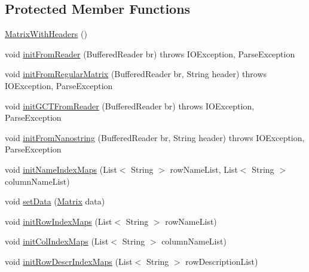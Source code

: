 \subsection*{Protected Member Functions}
\begin{DoxyCompactItemize}
\item 
\hyperlink{classbroad_1_1core_1_1datastructures_1_1_matrix_with_headers_a42a72c4a4dfca058d787728bbeabd106}{Matrix\+With\+Headers} ()
\item 
void \hyperlink{classbroad_1_1core_1_1datastructures_1_1_matrix_with_headers_ad1dda51b2e8707e56035714a58497111}{init\+From\+Reader} (Buffered\+Reader br)  throws I\+O\+Exception, 			\+Parse\+Exception 
\item 
void \hyperlink{classbroad_1_1core_1_1datastructures_1_1_matrix_with_headers_a96c809f62854178409a3f7dcd9623f7c}{init\+From\+Regular\+Matrix} (Buffered\+Reader br, String header)  throws I\+O\+Exception, Parse\+Exception 
\item 
void \hyperlink{classbroad_1_1core_1_1datastructures_1_1_matrix_with_headers_a8b562e19039440efdb63cf07a4bd4d83}{init\+G\+C\+T\+From\+Reader} (Buffered\+Reader br)  throws I\+O\+Exception, Parse\+Exception 
\item 
void \hyperlink{classbroad_1_1core_1_1datastructures_1_1_matrix_with_headers_a17270eccd2e5fe75b45d02e921331c13}{init\+From\+Nanostring} (Buffered\+Reader br, String header)  throws I\+O\+Exception, Parse\+Exception 
\item 
void \hyperlink{classbroad_1_1core_1_1datastructures_1_1_matrix_with_headers_a6a2f525112e1854bfa5c88efabb92b4c}{init\+Name\+Index\+Maps} (List$<$ String $>$ row\+Name\+List, List$<$ String $>$ column\+Name\+List)
\item 
void \hyperlink{classbroad_1_1core_1_1datastructures_1_1_matrix_with_headers_aba318448932df190ad98f6f13727fe65}{set\+Data} (\hyperlink{class_jama_1_1_matrix}{Matrix} data)
\item 
void \hyperlink{classbroad_1_1core_1_1datastructures_1_1_matrix_with_headers_a2d2aa137110ec59c81a845a9c0aea5a6}{init\+Row\+Index\+Maps} (List$<$ String $>$ row\+Name\+List)
\item 
void \hyperlink{classbroad_1_1core_1_1datastructures_1_1_matrix_with_headers_a49a5493e04b7998de5a00eca271510e6}{init\+Col\+Index\+Maps} (List$<$ String $>$ column\+Name\+List)
\item 
void \hyperlink{classbroad_1_1core_1_1datastructures_1_1_matrix_with_headers_ac0e1a1ef7d279d51d043ddc9ede20e31}{init\+Row\+Descr\+Index\+Maps} (List$<$ String $>$ row\+Description\+List)
\end{DoxyCompactItemize}



